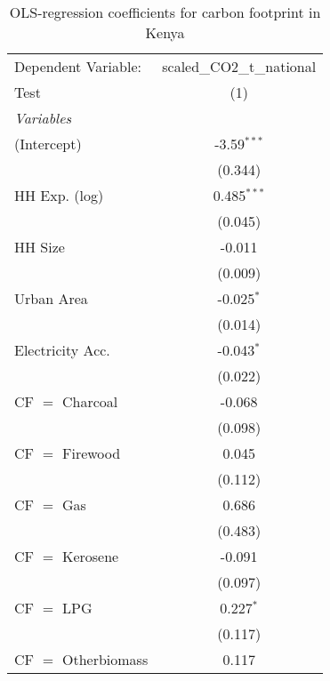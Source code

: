 
\begin{table}[htbp!]
   \centering
   \small
   \begin{adjustbox}{width = 1\textwidth, max height = 0.95\textheight, center}
      \begin{threeparttable}[b]
         \caption{\label{tab:OLS_2_KEN} OLS-regression coefficients for carbon footprint in Kenya}
         \begin{tabular}{lc}
            \tabularnewline \midrule \midrule
            Dependent Variable: & scaled\_CO2\_t\_national\\     
            Test                & (1)\\  
            \midrule
            \emph{Variables}\\
            (Intercept)         & -3.59$^{***}$\\   
                                & (0.344)\\   
            HH Exp. (log)       & 0.485$^{***}$\\   
                                & (0.045)\\   
            HH Size             & -0.011\\   
                                & (0.009)\\   
            Urban Area          & -0.025$^{*}$\\   
                                & (0.014)\\   
            Electricity Acc.    & -0.043$^{*}$\\   
                                & (0.022)\\   
            CF $=$ Charcoal     & -0.068\\   
                                & (0.098)\\   
            CF $=$ Firewood     & 0.045\\   
                                & (0.112)\\   
            CF $=$ Gas          & 0.686\\   
                                & (0.483)\\   
            CF $=$ Kerosene     & -0.091\\   
                                & (0.097)\\   
            CF $=$ LPG          & 0.227$^{*}$\\   
                                & (0.117)\\   
            CF $=$ Otherbiomass & 0.117\\   

\end{tabular}
\end{threeparttable}
\end{adjustbox}
\end{table}

